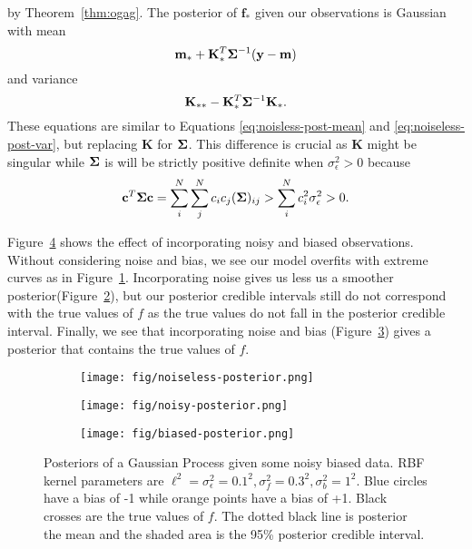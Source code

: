 by Theorem~\ref{thm:ogag}.
The posterior of $\mathbf{f}_*$ given our observations is Gaussian with mean
\begin{equation*}
    \mathbf{m}_* + \mathbf{K}_*^T \boldsymbol{\Sigma}^{-1} (\mathbf{y} - \mathbf{m})
\end{equation*}
and variance
\begin{equation*}
    \mathbf{K}_{* *} - \mathbf{K}_*^T \boldsymbol{\Sigma}^{-1} \mathbf{K}_*.
\end{equation*}
These equations are similar to Equations \ref{eq:noisless-post-mean} and \ref{eq:noiseless-post-var}, but replacing $\mathbf{K}$ for $\boldsymbol{\Sigma}$.
This difference is crucial as $\mathbf{K}$ might be singular
while $\boldsymbol{\Sigma}$ is will be strictly positive definite when $\sigma_{\epsilon}^2 > 0$ because
\begin{align*}
    \mathbf{c}^{T} \boldsymbol{\Sigma} \mathbf{c}
    = \sum_i^{N}\sum_{j}^{N} c_ic_j (\boldsymbol{\Sigma})_{ij}
    > \sum_{i}^{N}c_{i}^2 \sigma_{\epsilon}^{2}
    > 0.
\end{align*}

Figure~\ref{fig:gp-posteriors} shows the effect of incorporating noisy and biased observations.
Without considering noise and bias, we see our model overfits with extreme curves as in Figure~\ref{subfig:noiseless-post}.
Incorporating noise gives us less us a smoother posterior(Figure~\ref{subfig:noisy-posterior}),
but our posterior credible intervals still do not correspond with the true values of $f$ as the true values do not fall in the posterior credible interval.
Finally, we see that incorporating noise and bias (Figure~\ref{subfig:biased-posterior}) gives a posterior that
contains the true values of $f$.


\begin{figure}
    \centering
    \begin{subfigure}[b]{0.3\textwidth}
        \centering
        \texttt{[image: fig/noiseless-posterior.png]}
        \caption{}
        \label{subfig:noiseless-post}
    \end{subfigure}
    \hfill
    \begin{subfigure}[b]{0.3\textwidth}
        \centering
        \texttt{[image: fig/noisy-posterior.png]}
        \caption{}
        \label{subfig:noisy-posterior}
    \end{subfigure}
    \hfill
    \begin{subfigure}[b]{0.3\textwidth}
        \centering
        \texttt{[image: fig/biased-posterior.png]}
        \caption{}
        \label{subfig:biased-posterior}
    \end{subfigure}
    \hfill
    \caption{Posteriors of a Gaussian Process given some noisy biased data.
    RBF kernel parameters are $\ell^{2}  = \sigma^2_{\epsilon} = 0.1^2, \sigma^2_{f} = 0.3 ^ 2, \sigma^2_b = 1^2$.
    Blue circles have a bias of -1 while orange points have a bias of +1.
    Black crosses are the true values of $f$.
    The dotted black line is posterior the mean and the shaded area is the 95\% posterior credible interval.
    }
    \label{fig:gp-posteriors}
\end{figure}
